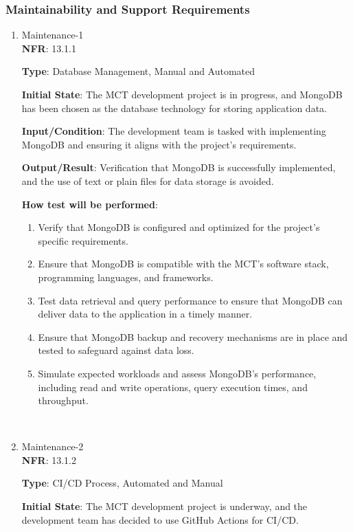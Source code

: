 \documentclass[12pt, titlepage]{article}
\begin{document}
\subsubsection{Maintainability and Support Requirements}

\begin{enumerate}
    \item {Maintenance-1\\}
\textbf{NFR}: 13.1.1

\textbf{Type}: Database Management, Manual and Automated

\textbf{Initial State}: The MCT development project is in progress, and MongoDB has been chosen as the database technology for storing application data.

\textbf{Input/Condition}: The development team is tasked with implementing MongoDB and ensuring it aligns with the project's requirements.

\textbf{Output/Result}: Verification that MongoDB is successfully implemented, and the use of text or plain files for data storage is avoided.

\textbf{How test will be performed}: 
\begin{enumerate}
    \item Verify that MongoDB is configured and optimized for the project's specific requirements.
    \item Ensure that MongoDB is compatible with the MCT's software stack, programming languages, and frameworks.
    \item Test data retrieval and query performance to ensure that MongoDB can deliver data to the application in a timely manner.
    \item Ensure that MongoDB backup and recovery mechanisms are in place and tested to safeguard against data loss.
    \item Simulate expected workloads and assess MongoDB's performance, including read and write operations, query execution times, and throughput.
\end{enumerate}


\\
 
    \item {Maintenance-2\\}
\textbf{NFR}: 13.1.2

\textbf{Type}: CI/CD Process, Automated and Manual

\textbf{Initial State}: The MCT development project is underway, and the development team has decided to use GitHub Actions for CI/CD.


\end{enumerate}
\end{document}
